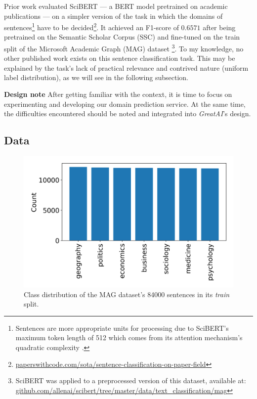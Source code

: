 Prior work evaluated SciBERT \cite{beltagy2019scibert} --- a BERT \cite{devlin2018bert} model pretrained on academic publications --- on a simpler version of the task in which the domains of sentences\footnote{Sentences are more appropriate units for processing due to SciBERT's maximum token length of 512 which comes from its attention mechanism's quadratic complexity \cite{vaswani2017attention}.} have to be decided\footnote{\href{https://paperswithcode.com/sota/sentence-classification-on-paper-field}{paperswithcode.com/sota/sentence-classification-on-paper-field}}. It achieved an F1-score of $0.6571$ after being pretrained on the Semantic Scholar Corpus (SSC) \cite{Lo2020S2ORCTS} and fine-tuned on the train split of the Microsoft Academic Graph (MAG) dataset \cite{wang2019review}\footnote{SciBERT was applied to a preprocessed version of this dataset, available at: \\ \href{https://github.com/allenai/scibert/tree/master/data/text_classification/mag}{github.com/allenai/scibert/tree/master/data/text\_classification/mag}}. To my knowledge, no other published work exists on this sentence classification task. This may be explained by the task's lack of practical relevance and contrived nature (uniform label distribution), as we will see in the following subsection.

\begin{displayquote}
\textbf{Design note} After getting familiar with the context, it is time to focus on experimenting and developing our domain prediction service. At the same time, the difficulties encountered should be noted and integrated into \textit{GreatAI}'s design.
\end{displayquote}

\subsection{Data}

\begin{figure}
    \centering
    \includegraphics[width=0.45\linewidth]{figures/mag-distribution.png}
    \captionsetup{width=.9\linewidth}
    \caption{Class distribution of the MAG  \cite{wang2019review} dataset's 84000 sentences in its \textit{train} split.}
    \label{fig:mag-distribtion}
\end{figure}

